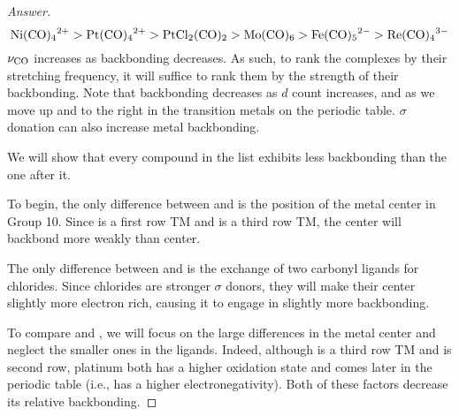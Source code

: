 \documentclass[../psets.tex]{subfiles}
\begin{document}
\begin{enumerate}
    \begin{proof}[Answer]

        \begin{equation*}
            \ce{Ni(CO)4^2+}
            > \ce{Pt(CO)4^2+}
            > \ce{PtCl2(CO)2}
            > \ce{Mo(CO)6}
            > \ce{Fe(CO)5^2-}
            > \ce{Re(CO)4^3-}
        \end{equation*}
        $\nu_{\ce{CO}}$ increases as backbonding decreases. As such, to rank the complexes by their  stretching frequency, it will suffice to rank them by the strength of their backbonding. Note that backbonding decreases as $d$ count increases, and as we move up and to the right in the transition metals on the periodic table.  $\sigma$ donation can also increase metal backbonding.\par\medskip
        We will show that every compound in the list exhibits less backbonding than the one after it.\par\smallskip
        To begin, the only difference between  and  is the position of the metal center in Group 10. Since  is a first row TM and  is a third row TM, the  center will backbond more weakly than  center.\par
        The only difference between  and  is the exchange of two carbonyl ligands for chlorides. Since chlorides are stronger $\sigma$ donors, they will make their  center slightly more electron rich, causing it to engage in slightly more backbonding.\par
        To compare  and , we will focus on the large differences in the metal center and neglect the smaller ones in the ligands. Indeed, although  is a third row TM and  is second row, platinum both has a higher oxidation state and comes later in the periodic table (i.e., has a higher electronegativity). Both of these factors decrease its relative backbonding.\par

\end{proof}
\end{enumerate}
\end{document}
